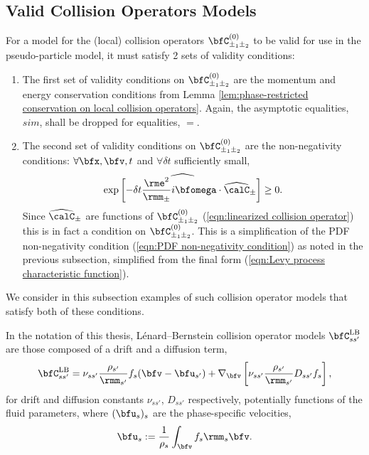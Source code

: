\subsection{Valid Collision Operators Models}\label{cha:collision operators}
    For a model for the (local) collision operators $\bfC_{\pm_{1}\pm_{2}}^{(0)}$ to be valid for use in the pseudo-particle model, it must satisfy 2 sets of validity conditions:
    \begin{enumerate}
        \item  The first set of validity conditions on $\bfC_{\pm_{1}\pm_{2}}^{(0)}$ are the momentum and energy conservation conditions from Lemma \ref{lem:phase-restricted conservation on local collision operators}. Again, the asymptotic equalities, $sim$, shall be dropped for equalities, $=$.

        \item  The second set of validity conditions on $\bfC_{\pm_{1}\pm_{2}}^{(0)}$ are the non-negativity conditions: $\forall \bfx, \bfv, t$ and $\forall \delta t$ sufficiently small,
        \begin{equation}\label{eqn:linearized collision operator non-negativity}
            \widehat{\exp\left[- \delta t\frac{\rme^{2}}{\rmm_{\pm}}i\bfomega\cdot\widehat{\calC}_{\pm}\right]}  \geq  0.
        \end{equation}
        Since $\widehat{\calC}_{\pm}$ are functions of $\bfC_{\pm_{1}\pm_{2}}^{(0)}$ (\ref{eqn:linearized collision operator}) this is in fact a condition on $\bfC_{\pm_{1}\pm_{2}}^{(0)}$. This is a simplification of the PDF non-negativity condition (\ref{eqn:PDF non-negativity condition}) as noted in the previous subsection, simplified from the final form (\ref{eqn:Levy process characteristic function}).
    \end{enumerate}
    
    We consider in this subsection examples of such collision operator models that satisfy both of these conditions.

    \line

    \begin{definition}
        In the notation of this thesis, Lénard--Bernstein collision operator models $\bfC_{ss'}^{\rm LB}$ are those composed of a drift and a diffusion term,
        \begin{equation}\label{eqn:Lénard--Bernstein operator}
            \bfC_{ss'}^{\rm LB}  =  \nu_{ss'}\frac{\rho_{s'}}{\rmm_{s'}}f_{s}(\bfv - \bfu_{s'}) + \nabla_{\bfv}\left[\nu_{ss'}\frac{\rho_{s'}}{\rmm_{s'}}D_{ss'}f_{s}\right],
        \end{equation}
        for drift and diffusion constants $\nu_{ss'}$, $D_{ss'}$ respectively, potentially functions of the fluid parameters, where $(\bfu_{s})_{s}$ are the phase-specific velocities,
        \begin{equation}
            \bfu_{s}  :=  \frac{1}{\rho_{s}}\int_{\bfv}f_{s}\rmm_{s}\bfv.
        \end{equation}
    \end{definition}

